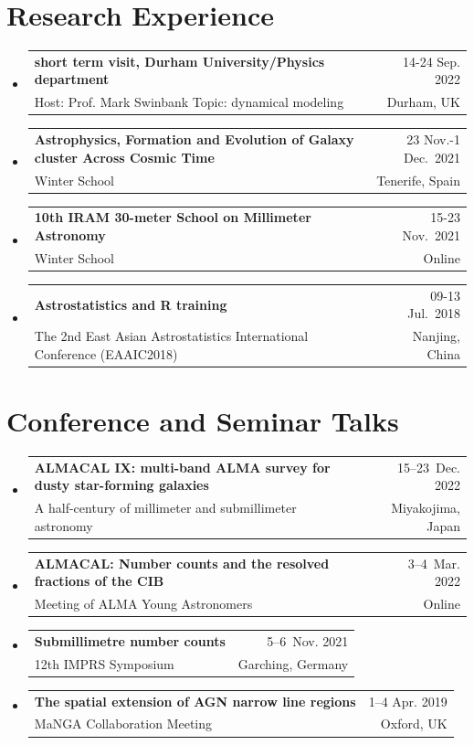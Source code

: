 \documentclass[A4,11pt]{article}
\makeatletter
\newcommand{\CVSubheading}[4]{
  \vspace{-2pt}\item
    \begin{tabular*}{0.97\textwidth}[t]{l@{\extracolsep{\fill}}r}
      \textbf{#1} & #2 \\
      \small#3 & \small #4 \\
    \end{tabular*}\vspace{-7pt}
}
\newcommand{\CVSubHeadingListStart}{\begin{itemize}[leftmargin=0.5cm, label={}]}
\newcommand{\CVSubHeadingListEnd}{\end{itemize}}
\makeatother
\begin{document}

\section{Research Experience}
  \CVSubHeadingListStart
    \CVSubheading 
      {short term visit, Durham University/Physics department}{14-24 Sep. 2022}
      {Host: Prof. Mark Swinbank Topic: dynamical modeling}{Durham, UK}
    \CVSubheading 
      {Astrophysics, Formation and Evolution of Galaxy cluster Across Cosmic Time}{23 Nov.-1 Dec.~2021}
      {Winter School}{Tenerife, Spain}
    \CVSubheading 
      {10th IRAM 30-meter School on Millimeter Astronomy}{15-23 Nov.~2021}
      {Winter School}{Online}
    \CVSubheading
      {Astrostatistics and R training}{09-13 Jul.~2018}
      {The 2nd East Asian Astrostatistics International Conference (EAAIC2018)}{Nanjing, China}
  \CVSubHeadingListEnd


\section{Conference and Seminar Talks}
  \CVSubHeadingListStart
    \CVSubheading
      {ALMACAL IX: multi-band ALMA survey for dusty star-forming galaxies}{15--23~Dec. 2022}
      {A half-century of millimeter and submillimeter astronomy}{Miyakojima, Japan}
    \CVSubheading
      {ALMACAL: Number counts and the resolved fractions of the CIB}{3--4~Mar. 2022}
      {Meeting of ALMA Young Astronomers}{Online}
    \CVSubheading
      {Submillimetre number counts}{5--6~Nov. 2021}
      {12th IMPRS Symposium}{Garching, Germany}
    \CVSubheading
      {The spatial extension of AGN narrow line regions}{1--4 Apr. 2019}
      {MaNGA Collaboration Meeting}{Oxford, UK}
  \CVSubHeadingListEnd

\end{document}
